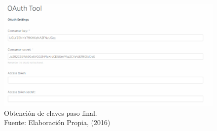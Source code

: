 \begin{figure}[H]
        \centering
        \captionsetup{justification=centering}
        \includegraphics[scale=0.6]{images/TwitterKeys.png}
        \caption[Obtención de claves paso final.]{Obtención de claves paso final.\\Fuente: Elaboración Propia, (2016)}
        \label{fig:TwitterKeys}
\end{figure}

